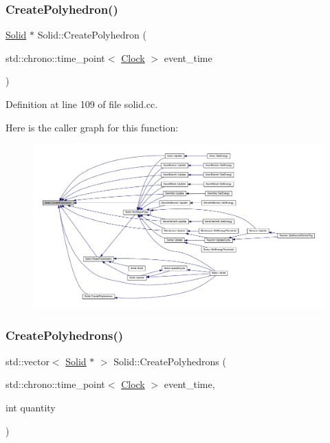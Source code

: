 \subsubsection{\texorpdfstring{Create\+Polyhedron()}{CreatePolyhedron()}}
{\footnotesize\ttfamily \hyperlink{class_solid}{Solid} $\ast$ Solid\+::\+Create\+Polyhedron (\begin{DoxyParamCaption}\item[{std\+::chrono\+::time\+\_\+point$<$ \hyperlink{universe_8h_a0ef8d951d1ca5ab3cfaf7ab4c7a6fd80}{Clock} $>$}]{event\+\_\+time }\end{DoxyParamCaption})}



Definition at line 109 of file solid.\+cc.

Here is the caller graph for this function\+:
\nopagebreak
\begin{figure}[H]
\begin{center}
\leavevmode
\includegraphics[width=350pt]{class_solid_a231b2c469aab60b092fcc3a9525e5c80_icgraph}
\end{center}
\end{figure}
\mbox{\label{class_solid_a40b2ea07e384aff138ba139c3c84f525}} 
\subsubsection{\texorpdfstring{Create\+Polyhedrons()}{CreatePolyhedrons()}}
{\footnotesize\ttfamily std\+::vector$<$ \hyperlink{class_solid}{Solid} $\ast$ $>$ Solid\+::\+Create\+Polyhedrons (\begin{DoxyParamCaption}\item[{std\+::chrono\+::time\+\_\+point$<$ \hyperlink{universe_8h_a0ef8d951d1ca5ab3cfaf7ab4c7a6fd80}{Clock} $>$}]{event\+\_\+time,  }\item[{int}]{quantity }\end{DoxyParamCaption})}



